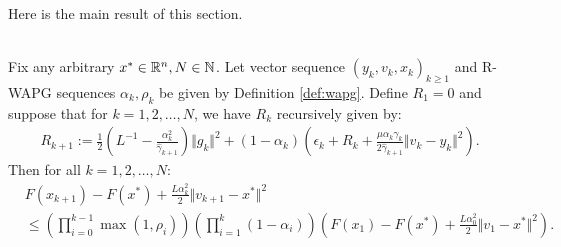 \documentclass[12pt]{article}
\begin{document}
    Here is the main result of this section. 
    \begin{proposition}\label{prop:wagp-convergence}\; \\
        Fix any arbitrary $x^* \in \mathbb R^n, N \in \mathbb N$. 
        Let vector sequence $(y_k, v_{k}, x_{k})_{k \ge 1}$ and R-WAPG sequences $\alpha_k, \rho_k$ be given by Definition \ref{def:wapg}. 
        Define $R_1 = 0$ and suppose that for $k = 1, 2, \ldots, N$, we have $R_k$ recursively given by: 
        \begin{align*}
            R_{k + 1}
            := 
            \frac{1}{2}\left(
                L^{-1} - \frac{\alpha_k^2}{\hat \gamma_{k + 1}}
            \right)\Vert g_k\Vert^2
            + 
            (1 - \alpha_k)
            \left(
                \epsilon_k + R_k + 
                \frac{\mu\alpha_k\gamma_k}{2\hat \gamma_{k + 1}}
                \Vert v_k - y_k\Vert^2
            \right). 
        \end{align*}
        Then for all $k = 1, 2, \ldots, N$: 
        \begin{align*}
            & F(x_{k + 1}) - F(x^*) + \frac{L \alpha_k^2}{2}\Vert v_{k + 1} - x^*\Vert^2
            \\
            &\le 
            \left(
                \prod_{i = 0}^{k - 1} \max(1, \rho_{i})
            \right)
            \left(
                \prod_{i = 1}^{k} \left(1  - \alpha_i\right)
            \right)
            \left(
                F(x_1) - F(x^*) + \frac{L\alpha_0^2}{2}\Vert v_1 - x^*\Vert^2
            \right). 
        \end{align*}
    \end{proposition}
    
\end{document}
